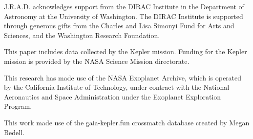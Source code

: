 \documentclass[twocolumn]{aastex62}
\begin{document}
J.R.A.D. acknowledges support from the DIRAC Institute in the Department of Astronomy at the University of Washington. The DIRAC Institute is supported through generous gifts from the Charles and Lisa Simonyi Fund for Arts and Sciences, and the Washington Research Foundation.

This paper includes data collected by the Kepler mission. Funding for the Kepler mission is provided by the NASA Science Mission directorate.

This research has made use of the NASA Exoplanet Archive, which is operated by the California Institute of Technology, under contract with the National Aeronautics and Space Administration under the Exoplanet Exploration Program.

This work made use of the gaia-kepler.fun crossmatch database created by Megan Bedell.


\end{document}
